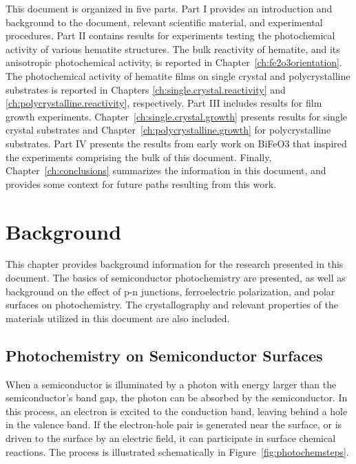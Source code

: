 \documentclass[12pt,%
              twoside,
               letterpaper]{uiothesis}
\begin{document}
This document is organized in five parts. Part I provides an introduction and background
to the document, relevant scientific material, and experimental procedures. Part II
contains results for experiments testing the photochemical activity of various hematite
structures. The bulk reactivity of hematite, and its anisotropic photochemical activity,
is reported in Chapter~\ref{ch:fe2o3orientation}. The photochemical activity of hematite films
on single crystal and polycrystalline substrates is reported in Chapters
\ref{ch:single.crystal.reactivity} and \ref{ch:polycrystalline.reactivity}, respectively.
Part III includes results for film growth experiments. Chapter~\ref{ch:single.crystal.growth}
presents results for single crystal substrates and Chapter~\ref{ch:polycrystalline.growth} for
polycrystalline substrates. Part IV presents the results from early work on BiFeO3
that inspired the experiments comprising the bulk of this document. Finally,
Chapter~\ref{ch:conclusions} summarizes the information in this document, and provides some
context for future paths resulting from this work.


\chapter{Background}
\label{ch:background}

This chapter provides background information for the research presented in this
document. The basics of semiconductor photochemistry are presented, as well as background
on the effect of p-n junctions, ferroelectric polarization, and polar surfaces on
photochemistry. The crystallography and relevant properties of the materials utilized in
this document are also included.

\section{Photochemistry on Semiconductor Surfaces}
\label{sec:background.semiconductorphotochem}

When a semiconductor is illuminated by a photon with energy larger than the
semiconductor's band gap, the photon can be absorbed by the
semiconductor.\cite{Morrison:1980va} In this process, an electron is excited to the
conduction band, leaving behind a hole in the valence band. If the electron-hole pair is
generated near the surface, or is driven to the surface by an electric field, it can
participate in surface chemical reactions. The process is illustrated schematically in
Figure~\ref{fig:photochemsteps}.
\end{document}
